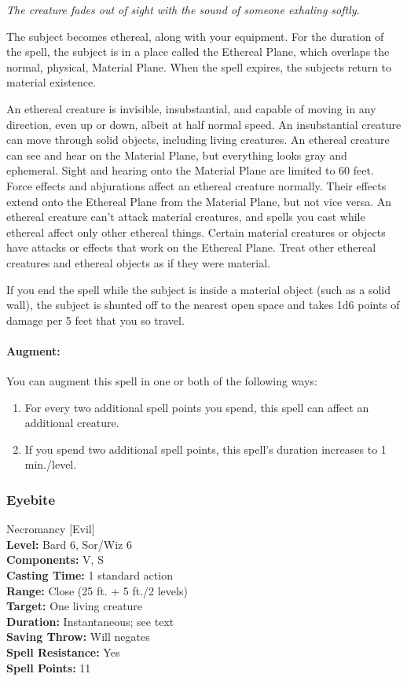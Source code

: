 \emph{The creature fades out of sight with the sound of someone exhaling softly.}

The subject becomes ethereal, along with your equipment. 
For the duration of the spell, the subject is in a place called the Ethereal Plane, which overlaps the normal, physical, Material Plane. 
When the spell expires, the subjects return to material existence.

An ethereal creature is invisible, insubstantial, and capable of moving in any direction, even up or down, albeit at half normal speed. 
An insubstantial creature can move through solid objects, including living creatures. 
An ethereal creature can see and hear on the Material Plane, but everything looks gray and ephemeral. 
Sight and hearing onto the Material Plane are limited to 60 feet.
Force effects and abjurations affect an ethereal creature normally. 
Their effects extend onto the Ethereal Plane from the Material Plane, but not vice versa. 
An ethereal creature can't attack material creatures, and spells you cast while ethereal affect only other ethereal things. 
Certain material creatures or objects have attacks or effects that work on the Ethereal Plane.
Treat other ethereal creatures and ethereal objects as if they were material.

If you end the spell while the subject is inside a material object (such as a solid wall), 
the subject is shunted off to the nearest open space and takes 1d6 points of damage per 5 feet that you so travel. 

\paragraph{Augment:} You can augment this spell in one or both of the following ways:
\begin{enumerate}
 \item For every two additional spell points you spend, this spell can affect an additional creature.
 \item If you spend two additional spell points, this spell's duration increases to 1 min./level.
\end{enumerate}
\subsubsection{Eyebite}
\label{Spell:Eyebite}
Necromancy [Evil]
\\ \textbf{Level:} Bard 6, Sor/Wiz 6
\\ \textbf{Components:} V, S
\\ \textbf{Casting Time:} 1 standard action
\\ \textbf{Range:} Close (25 ft. + 5 ft./2 levels)
\\ \textbf{Target:} One living creature
\\ \textbf{Duration:} Instantaneous; see text
\\ \textbf{Saving Throw:} Will negates
\\ \textbf{Spell Resistance:} Yes
\\ \textbf{Spell Points:} 11

